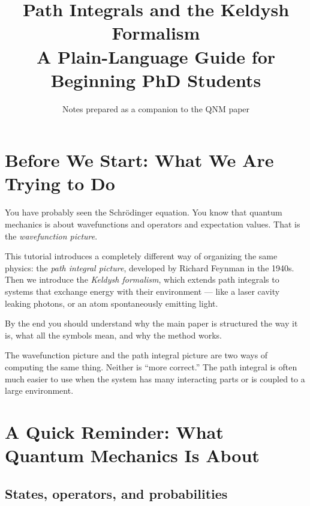 \documentclass[12pt]{article}
\begin{document}
\title{\textbf{Path Integrals and the Keldysh Formalism}\\[0.4em]
\large A Plain-Language Guide for Beginning PhD Students}

\author{Notes prepared as a companion to the QNM paper}
\date{}
\maketitle
\tableofcontents
\newpage

\section{Before We Start: What We Are Trying to Do}

You have probably seen the Schrödinger equation. You know that quantum
mechanics is about wavefunctions and operators and expectation values.
That is the \emph{wavefunction picture}.

This tutorial introduces a completely different way of organizing the
same physics: the \emph{path integral picture}, developed by Richard
Feynman in the 1940s. Then we introduce the \emph{Keldysh formalism},
which extends path integrals to systems that exchange energy with their
environment --- like a laser cavity leaking photons, or an atom
spontaneously emitting light.

By the end you should understand why the main paper is structured the
way it is, what all the symbols mean, and why the method works.

\begin{idea}
The wavefunction picture and the path integral picture are two
ways of computing the same thing. Neither is ``more correct.''
The path integral is often much easier to use when the system has
many interacting parts or is coupled to a large environment.
\end{idea}

\section{A Quick Reminder: What Quantum Mechanics Is About}

\subsection{States, operators, and probabilities}
\end{document}
